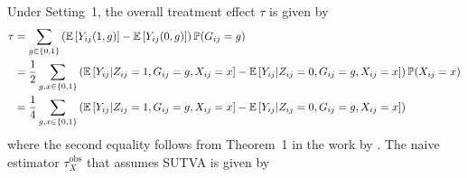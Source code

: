 \documentclass[10pt]{article}
\begin{document}
Under Setting~1, the overall treatment effect $\tau$ is given by
\begin{align*}
\tau %
&= \sum_{g\in\{0,1\}} \left(\E\left[Y_{ij}(1,g)\right] - \E\left[Y_{ij}(0,g)\right]\right)\P(G_{ij}=g) \\
&= \frac{1}{2}\sum_{g,x\in\{0,1\}} \left(\E\left[Y_{ij}|Z_{ij}=1,G_{ij}=g,X_{ij}=x\right] - \E\left[Y_{ij}|Z_{ij}=0,G_{ij}=g,X_{ij}=x\right]\right)\P(X_{ij}=x) \\
&= \frac{1}{4}\sum_{g,x\in\{0,1\}} \left(\E\left[Y_{ij}|Z_{ij}=1,G_{ij}=g,X_{ij}=x\right] - \E\left[Y_{ij}|Z_{ij}=0,G_{ij}=g,X_{ij}=x\right]\right)
\end{align*}
where the second equality follows from Theorem~1 in the work by \textcite{Forastiere:2021}. The naive estimator $\tau_{X}^\text{obs}$ that assumes SUTVA is given by
\end{document}
